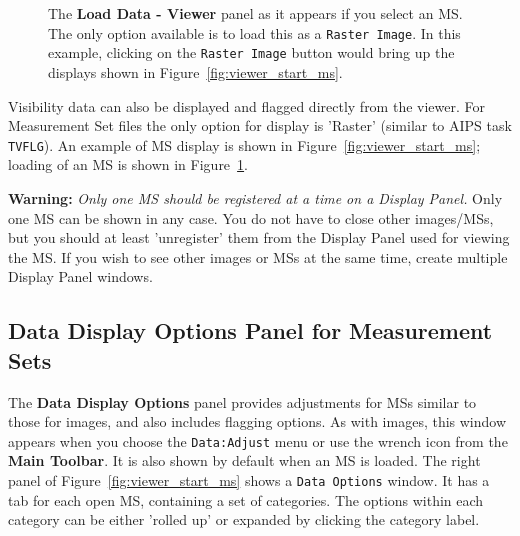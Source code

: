 \begin{figure}[h!]
\begin{center}
\caption{\label{fig:viewer_load_ms} The {\bf Load Data - Viewer} panel
as it appears if you select an MS.  The only option available is
to load this as a {\tt Raster Image}.  In this example, clicking
on the {\tt Raster Image} button would bring up the displays shown
in Figure~\ref{fig:viewer_start_ms}.}
\hrulefill
\end{center}
\end{figure}

Visibility data can also be displayed and flagged directly from the
viewer. For Measurement Set files the only option for display is 'Raster'
(similar to AIPS task {\tt TVFLG}).  An example of MS display is
shown in Figure~\ref{fig:viewer_start_ms}; loading of an
MS is shown in Figure~\ref{fig:viewer_load_ms}.  

{\bf Warning:} {\em Only one MS should be registered at a time on a
Display Panel.} 
Only one MS can be shown in any case.  
You do not have to close other images/MSs, but you should at
least 'unregister' them from the Display Panel used for viewing the MS.
If you wish to see other images or MSs at the same time, create multiple
Display Panel windows.

 


\subsection{Data Display Options Panel for Measurement Sets}
\label{section:display.ms.adjust}

The {\bf Data Display Options} panel provides adjustments for MSs
similar to those for images, and also includes flagging options.
As with images, this window appears when you choose the {\tt Data:Adjust}
menu or use the wrench icon from the {\bf Main Toolbar}. It is also shown
by default when an MS is loaded. The right panel
of Figure~\ref{fig:viewer_start_ms} shows a {\tt Data Options} window. 
It has a tab for each open MS, containing a set of categories.  The
options within each category can be either 'rolled up' or expanded by
clicking the category label.

